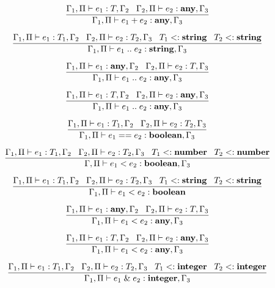 \[
\dfrac{\Gamma_{1}, \Pi \vdash e_{1}:T, \Gamma_{2} \;\;\;
       \Gamma_{2}, \Pi \vdash e_{2}:\mathbf{any}, \Gamma_{3}}
      {\Gamma_{1}, \Pi \vdash e_{1} + e_{2}:\mathbf{any}, \Gamma_{3}}
\]

\[
\dfrac{\Gamma_{1}, \Pi \vdash e_{1}:T_{1}, \Gamma_{2} \;\;\;
       \Gamma_{2}, \Pi \vdash e_{2}:T_{2}, \Gamma_{3} \;\;\;
       T_{1} <: \mathbf{string} \;\;\;
       T_{2} <: \mathbf{string}}
      {\Gamma_{1}, \Pi \vdash e_{1} \; {..} \; e_{2}:\mathbf{string}, \Gamma_{3}}
\]

\[
\dfrac{\Gamma_{1}, \Pi \vdash e_{1}:\mathbf{any}, \Gamma_{2} \;\;\;
       \Gamma_{2}, \Pi \vdash e_{2}:T, \Gamma_{3}}
      {\Gamma_{1}, \Pi \vdash e_{1} \; {..} \; e_{2}:\mathbf{any}, \Gamma_{3}}
\]

\[
\dfrac{\Gamma_{1}, \Pi \vdash e_{1}:T, \Gamma_{2} \;\;\;
       \Gamma_{2}, \Pi \vdash e_{2}:\mathbf{any}, \Gamma_{3}}
      {\Gamma_{1}, \Pi \vdash e_{1} \; {..} \; e_{2}:\mathbf{any}, \Gamma_{3}}
\]

\[
\dfrac{\Gamma_{1}, \Pi \vdash e_{1}:T_{1}, \Gamma_{2} \;\;\;
       \Gamma_{2}, \Pi \vdash e_{2}:T_{2}, \Gamma_{3}}
      {\Gamma_{1}, \Pi \vdash e_{1} == e_{2}:\mathbf{boolean}, \Gamma_{3}}
\]

\[
\dfrac{\Gamma_{1}, \Pi \vdash e_{1}:T_{1}, \Gamma_{2} \;\;\;
       \Gamma_{2}, \Pi \vdash e_{2}:T_{2}, \Gamma_{3} \;\;\;
       T_{1} <: \mathbf{number} \;\;\;
       T_{2} <: \mathbf{number}}
      {\Gamma, \Pi \vdash e_{1} < e_{2}:\mathbf{boolean}, \Gamma_{3}}
\]

\[
\dfrac{\Gamma_{1}, \Pi \vdash e_{1}:T_{1}, \Gamma_{2} \;\;\;
       \Gamma_{2}, \Pi \vdash e_{2}:T_{2}, \Gamma_{3} \;\;\;
       T_{1} <: \mathbf{string} \;\;\;
       T_{2} <: \mathbf{string}}
      {\Gamma_{1}, \Pi \vdash e_{1} < e_{2}:\mathbf{boolean}}
\]

\[
\dfrac{\Gamma_{1}, \Pi \vdash e_{1}:\mathbf{any}, \Gamma_{2} \;\;\;
       \Gamma_{2}, \Pi \vdash e_{2}:T, \Gamma_{3}}
      {\Gamma_{1}, \Pi \vdash e_{1} < e_{2}:\mathbf{any}, \Gamma_{3}}
\]

\[
\dfrac{\Gamma_{1}, \Pi \vdash e_{1}:T, \Gamma_{2} \;\;\;
       \Gamma_{2}, \Pi \vdash e_{2}:\mathbf{any}, \Gamma_{3}}
      {\Gamma_{1}, \Pi \vdash e_{1} < e_{2}:\mathbf{any}, \Gamma_{3}}
\]

\[
\dfrac{\Gamma_{1}, \Pi \vdash e_{1}:T_{1}, \Gamma_{2} \;\;\;
       \Gamma_{2}, \Pi \vdash e_{2}:T_{2}, \Gamma_{3} \;\;\;
       T_{1} <: \mathbf{integer} \;\;\;
       T_{2} <: \mathbf{integer}}
      {\Gamma_{1}, \Pi \vdash e_{1} \;\&\; e_{2}:\mathbf{integer}, \Gamma_{3}}
\]

